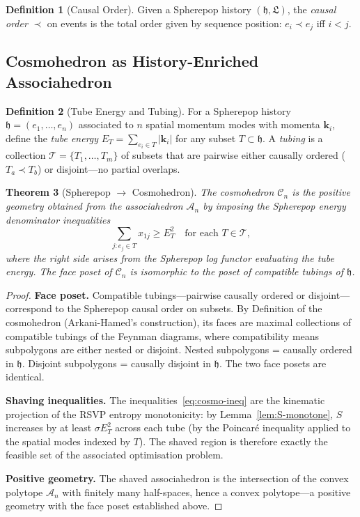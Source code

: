 \documentclass[12pt, oneside]{amsart}
\theoremstyle{plain}
\newtheorem{theorem}{Theorem}[section]
\theoremstyle{definition}
\newtheorem{definition}[theorem]{Definition}
\theoremstyle{remark}
\newcommand{\Sf}{S}         %
\newcommand{\hist}{\mathfrak{h}}
\newcommand{\Log}{\mathfrak{L}}
\newcommand{\Assoc}{\mathcal{A}_n}
\newcommand{\Cosmo}{\mathcal{C}_n}
\begin{document}
\begin{definition}[Causal Order]
Given a Spherepop history $(\hist, \Log)$, the \emph{causal order} $\prec$ on events is the total order given by sequence position: $e_i \prec e_j$ iff $i < j$.
\end{definition}

\subsection{Cosmohedron as History-Enriched Associahedron}

\begin{definition}[Tube Energy and Tubing]
For a Spherepop history $\hist = (e_1, \ldots, e_n)$ associated to $n$ spatial momentum modes with momenta $\mathbf{k}_i$, define the \emph{tube energy} $E_T = \sum_{e_i \in T} |\mathbf{k}_i|$ for any subset $T \subset \hist$. A \emph{tubing} is a collection $\mathcal{T} = \{T_1, \ldots, T_m\}$ of subsets that are pairwise either causally ordered ($T_a \prec T_b$) or disjoint---no partial overlaps.
\end{definition}

\begin{theorem}[Spherepop $\to$ Cosmohedron]
\label{thm:cosmo}
The cosmohedron $\Cosmo$ is the positive geometry obtained from the associahedron $\Assoc$ by imposing the Spherepop energy denominator inequalities
\begin{equation}
\label{eq:cosmo-ineq}
  \sum_{j: e_j \in T} x_{1j} \geq E_T^2 \quad \text{for each } T \in \mathcal{T},
\end{equation}
where the right side arises from the Spherepop log functor evaluating the tube energy. The face poset of $\Cosmo$ is isomorphic to the poset of compatible tubings of $\hist$.
\end{theorem}

\begin{proof}
\textbf{Face poset.} Compatible tubings---pairwise causally ordered or disjoint---correspond to the Spherepop causal order on subsets. By Definition of the cosmohedron (Arkani-Hamed's construction), its faces are maximal collections of compatible tubings of the Feynman diagrams, where compatibility means subpolygons are either nested or disjoint. Nested subpolygons = causally ordered in $\hist$. Disjoint subpolygons = causally disjoint in $\hist$. The two face posets are identical.

\textbf{Shaving inequalities.} The inequalities~\eqref{eq:cosmo-ineq} are the kinematic projection of the RSVP entropy monotonicity: by Lemma~\ref{lem:S-monotone}, $\Sf$ increases by at least $\sigma E_T^2$ across each tube (by the Poincaré inequality applied to the spatial modes indexed by $T$). The shaved region is therefore exactly the feasible set of the associated optimisation problem.

\textbf{Positive geometry.} The shaved associahedron is the intersection of the convex polytope $\Assoc$ with finitely many half-spaces, hence a convex polytope---a positive geometry with the face poset established above.
\end{proof}
\end{document}
